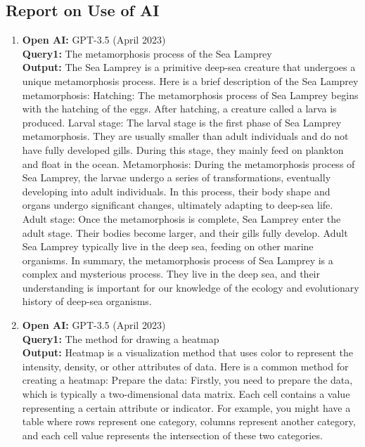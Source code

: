 \documentclass{mcmthesis}
\begin{document}
\begin{appendices}
  \section{Report on Use of AI}
  \begin{enumerate}
    \item \textbf{Open AI:} GPT-3.5 (April 2023)\\
          \textbf{Query1:} The metamorphosis process of the Sea Lamprey\\
          \textbf{Output:} The Sea Lamprey is a primitive deep-sea creature that undergoes a unique metamorphosis process. Here is a brief description of the Sea Lamprey metamorphosis:
          Hatching: The metamorphosis process of Sea Lamprey begins with the hatching of the eggs. After hatching, a creature called a larva is produced.
          Larval stage: The larval stage is the first phase of Sea Lamprey metamorphosis. They are usually smaller than adult individuals and do not have fully developed gills. During this stage, they mainly feed on plankton and float in the ocean.
          Metamorphosis: During the metamorphosis process of Sea Lamprey, the larvae undergo a series of transformations, eventually developing into adult individuals. In this process, their body shape and organs undergo significant changes, ultimately adapting to deep-sea life.
          Adult stage: Once the metamorphosis is complete, Sea Lamprey enter the adult stage. Their bodies become larger, and their gills fully develop. Adult Sea Lamprey typically live in the deep sea, feeding on other marine organisms.
          In summary, the metamorphosis process of Sea Lamprey is a complex and mysterious process. They live in the deep sea, and their understanding is important for our knowledge of the ecology and evolutionary history of deep-sea organisms.
    \item \textbf{Open AI:} GPT-3.5 (April 2023)\\
          \textbf{Query1:} The method for drawing a heatmap\\
          \textbf{Output:} Heatmap is a visualization method that uses color to represent the intensity, density, or other attributes of data. Here is a common method for creating a heatmap:
          Prepare the data: Firstly, you need to prepare the data, which is typically a two-dimensional data matrix. Each cell contains a value representing a certain attribute or indicator. For example, you might have a table where rows represent one category, columns represent another category, and each cell value represents the intersection of these two categories.

\end{enumerate}
\end{appendices}
\end{document}
